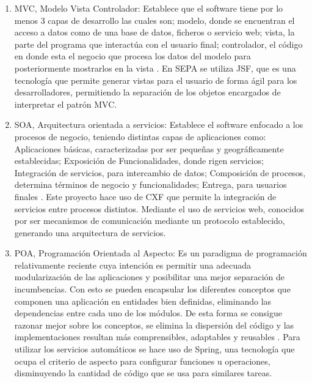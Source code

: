 \documentclass[a4paper,12pt,openany,oneside]{book}
\begin{document}
\begin{enumerate}

\item MVC, Modelo Vista Controlador: Establece que el software tiene por lo menos 3 capas de desarrollo las cuales son; modelo, donde se encuentran el acceso a datos como de una base de datos, ficheros o servicio web; vista, la parte del programa que interactúa con el usuario final; controlador, el código en donde esta el negocio que procesa los datos del modelo para posteriormente mostrarlos en la vista \cite{data22}. En SEPA se utiliza JSF, que es una tecnología que permite generar vistas para el usuario de forma ágil para los desarrolladores, permitiendo la separación de los objetos encargados de interpretar el patrón MVC.

\item SOA, Arquitectura orientada a servicios: Establece el software enfocado a los procesos de negocio, teniendo distintas capas de aplicaciones como: Aplicaciones básicas, caracterizadas por ser pequeñas y geográficamente establecidas; Exposición de Funcionalidades, donde rigen servicios; Integración de servicios, para intercambio de datos; Composición de procesos, determina términos de negocio y funcionalidades; Entrega, para usuarios finales \cite{data23}. Este proyecto hace uso de CXF que permite la integración de servicios entre procesos distintos. Mediante el uso de servicios web, conocidos por ser mecanismos de comunicación mediante un protocolo establecido, generando una arquitectura de servicios.

\item POA, Programación Orientada al Aspecto: Es un paradigma de programación relativamente reciente cuya intención es permitir una adecuada modularización de las aplicaciones y posibilitar una mejor separación de incumbencias. Con esto se pueden encapsular los diferentes conceptos que componen una aplicación en entidades bien definidas, eliminando las dependencias entre cada uno de los módulos. De esta forma se consigue razonar mejor sobre los conceptos, se elimina la dispersión del código y las implementaciones resultan más comprensibles, adaptables y reusables \cite{data24}. Para utilizar los servicios automáticos se hace uso de Spring, una tecnología que ocupa el criterio de aspecto para configurar funciones u operaciones, disminuyendo la cantidad de código que se usa para similares tareas.


\end{enumerate}
\end{document}
